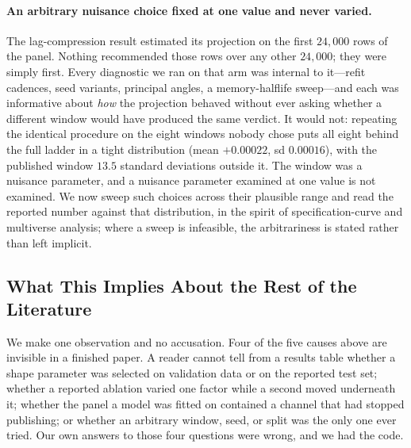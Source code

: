 \paragraph{An arbitrary nuisance choice fixed at one value and never varied.}
The lag-compression result estimated its projection on the first $24{,}000$
rows of the panel. Nothing recommended those rows over any other $24{,}000$;
they were simply first. Every diagnostic we ran on that arm was internal to
it---refit cadences, seed variants, principal angles, a memory-halflife
sweep---and each was informative about \emph{how} the projection behaved
without ever asking whether a different window would have produced the same
verdict. It would not: repeating the identical procedure on the eight windows
nobody chose puts all eight behind the full ladder in a tight distribution
(mean $+0.00022$, sd $0.00016$), with the published window $13.5$ standard
deviations outside it. The window was a nuisance parameter, and a nuisance
parameter examined at one value is not examined. We now sweep such choices
across their plausible range and read the reported number against that
distribution, in the spirit of specification-curve and multiverse analysis;
where a sweep is infeasible, the arbitrariness is stated rather than left
implicit.

\subsection{What This Implies About the Rest of the Literature}

We make one observation and no accusation. Four of the five causes above are
invisible in a finished paper. A reader cannot tell from a results table
whether a shape parameter was selected on validation data or on the reported
test set; whether a reported ablation varied one factor while a second moved
underneath it; whether the panel a model was fitted on contained a channel that
had stopped publishing; or whether an arbitrary window, seed, or split was the
only one ever tried. Our own answers to those four questions were wrong, and we
had the code.
